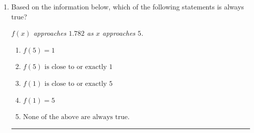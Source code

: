 \documentclass[14pt]{extbook}
\newcommand{\litem}[1]{\item#1\hspace*{-1cm}\rule{\textwidth}{0.4pt}}
\begin{document}
\begin{enumerate}
{\begin{enumerate}[label=\Alph*.]
\end{enumerate} }
\litem{
Based on the information below, which of the following statements is always true?
\begin{center}
    \textit{ $f(x)$ approaches $1.782$ as $x$ approaches $5$. }
\end{center}
\begin{enumerate}[label=\Alph*.]
\item \( f(5) = 1 \)
\item \( f(5) \text{ is close to or exactly } 1 \)
\item \( f(1) \text{ is close to or exactly } 5 \)
\item \( f(1) = 5 \)
\item \( \text{None of the above are always true.} \)

\end{enumerate} }
\end{enumerate}
\end{document}
